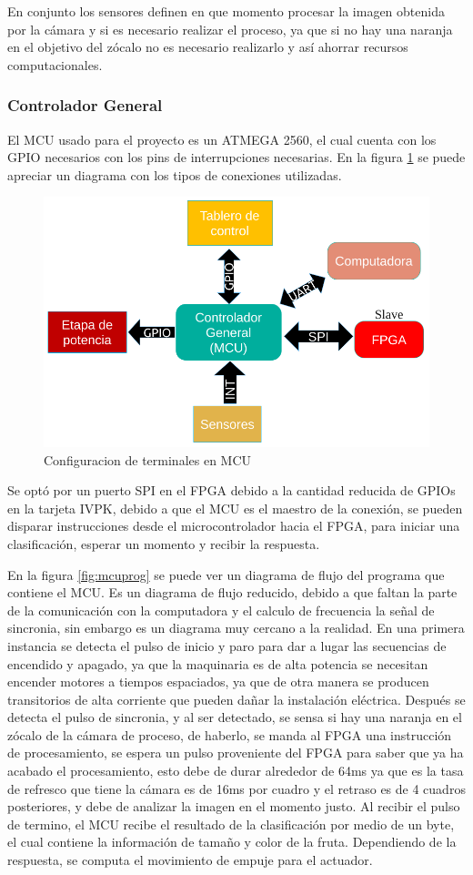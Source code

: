 \documentclass[twoside,spanish,ESP,MSc]{plantillaLabUPV}
\theoremstyle{definition}
\begin{document}
En conjunto los sensores definen en que momento procesar la imagen obtenida por la cámara y si es necesario realizar el proceso, ya que si no hay una naranja en el objetivo del zócalo no es necesario realizarlo y así ahorrar recursos computacionales.


\subsubsection{Controlador General}
El MCU usado para el proyecto es un ATMEGA 2560, el cual cuenta con los GPIO necesarios con los pins de interrupciones necesarias. En la figura \ref{fig:pins} se puede apreciar un diagrama con los tipos de conexiones utilizadas.

\begin{figure}
	\centering
	\includegraphics[width=0.7\linewidth]{edrawimas/pins}
	\caption{Configuracion de terminales en MCU}
	\label{fig:pins}
\end{figure}

Se optó por un puerto SPI en el FPGA debido a la cantidad reducida de GPIOs en la tarjeta IVPK, debido a que el MCU es el maestro de la conexión, se pueden disparar instrucciones desde el microcontrolador hacia el FPGA, para iniciar una clasificación, esperar un momento y recibir la respuesta.

En la figura \ref{fig:mcuprog} se puede ver un diagrama de flujo del programa que contiene el MCU. Es un diagrama de flujo reducido, debido a que faltan la parte de la comunicación con la computadora y el calculo de frecuencia la señal de sincronia, sin embargo es un diagrama muy cercano a la realidad. En una primera instancia se detecta el pulso de inicio y paro para dar a lugar las secuencias de encendido y apagado, ya que la maquinaria es de alta potencia se necesitan encender motores a tiempos espaciados, ya que de otra manera se producen transitorios de alta corriente que pueden dañar la instalación eléctrica. Después se detecta el pulso de sincronia, y al ser detectado, se sensa si hay una naranja en el zócalo de la cámara de proceso, de haberlo, se manda al FPGA una instrucción de procesamiento, se espera un pulso proveniente del FPGA para saber que ya ha acabado el procesamiento, esto debe de durar alrededor de 64ms ya que es la tasa de refresco que tiene la cámara es de 16ms por cuadro y el retraso es de 4 cuadros posteriores, y debe de analizar la imagen en el momento justo. Al recibir el pulso de termino, el MCU recibe el resultado de la clasificación por medio de un byte, el cual contiene la información de tamaño y color de la fruta. Dependiendo de la respuesta, se computa el movimiento de empuje para el actuador.
\end{document}
